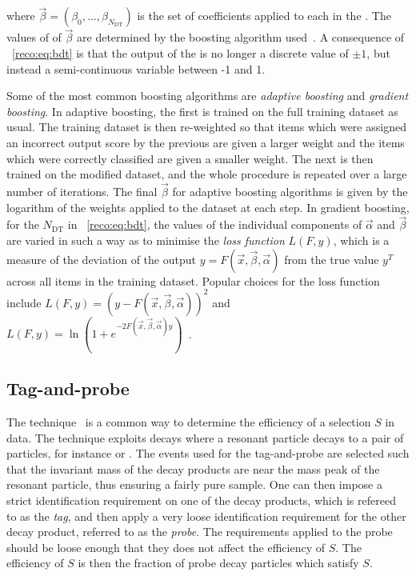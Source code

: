 where $\vec{\beta}=(\beta_{0},...,\beta_{N_{\textrm{DT}}})$ is the set of coefficients applied to each \DT in the \BDT. The values of of $\vec{\beta}$ are determined by the boosting algorithm used~\cite{friedman2009,TMVA}. A consequence of \Eq~\ref{reco:eq:bdt} is that the output of the \BDT is no longer a discrete value of $\pm1$, but instead a semi-continuous variable between -1 and 1. 

Some of the most common boosting algorithms are \emph{adaptive boosting} and \emph{gradient boosting}. In adaptive boosting, the first \DT is trained on the full training dataset as usual. The training dataset is then re-weighted so that items which were assigned an incorrect output score by the previous \DT are given a larger weight and the items which were correctly classified are given a smaller weight. The next \DT is then trained on the modified dataset, and the whole procedure is repeated over a large number of iterations. The final $\vec{\beta}$ for adaptive boosting algorithms is given by the logarithm of the weights applied to the dataset at each step. In gradient boosting, for the $N_{\textrm{DT}}$ \DT\s in \Eq~\ref{reco:eq:bdt}, the values of the individual components of $\vec{\alpha}$ and $\vec{\beta}$ are varied in such a way as to minimise the \emph{loss function} $L(F,y)$, which is a measure of the deviation of the \BDT output $y = F(\vec{x},\vec{\beta},\vec{\alpha})$ from the true value $y^T$ across all items in the training dataset. Popular choices for the loss function include $L(F,y) = ( y - F(\vec{x},\vec{\beta},\vec{\alpha}))^2$ and  $L(F,y) = \ln (1 + e^{-2F(\vec{x},\vec{\beta},\vec{\alpha})y})$~\cite{friedman2009,TMVA}.

\subsection{Tag-and-probe}
\label{reco:sec:tagandprobe}

The \TagAndProbe technique~\cite{TagAndProbe} is a common way to determine the efficiency of a selection $S$ in data. The technique exploits decays where a resonant particle decays to a pair of particles, for instance \Zee or \Zmumu. The events used for the tag-and-probe are selected such that the invariant mass of the decay products are near the mass peak of the resonant particle, thus ensuring a fairly pure sample. One can then impose a strict identification requirement on one of the decay products, which is refereed to as the \emph{tag}, and then apply a very loose identification requirement for the other decay product, referred to as the \emph{probe}. The requirements applied to the probe should be loose enough that they does not affect the efficiency of $S$. The efficiency of $S$ is then the fraction of probe decay particles which satisfy $S$. 

